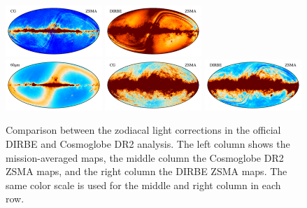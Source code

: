 \documentclass{aa}
\begin{document}
\begin{figure}
    \includegraphics[width=0.325\textwidth]{figs/zsma_compare/cosmoglobe_zsma_06.pdf}
    \includegraphics[width=0.325\textwidth]{figs/zsma_compare/dirbe_zsma_06.pdf}\\
    \includegraphics[width=0.325\textwidth]{figs/zsma_compare/cosmoglobe_ma_07.pdf}
    \includegraphics[width=0.325\textwidth]{figs/zsma_compare/cosmoglobe_zsma_07.pdf}
    \includegraphics[width=0.325\textwidth]{figs/zsma_compare/dirbe_zsma_07.pdf}\\
    \caption{Comparison between the zodiacal light corrections in the official DIRBE and Cosmoglobe DR2 analysis. The left column shows the mission-averaged maps, the middle column the Cosmoglobe DR2 ZSMA maps, and the right column the DIRBE ZSMA maps. The same color scale is used for the middle and right column in each row.}
    \label{fig:dr2-zsma-compare}
\end{figure}
\end{document}
